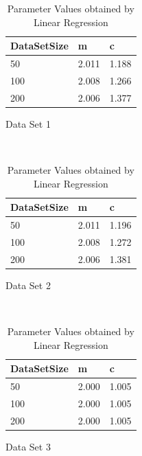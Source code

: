 \documentclass[14pt]{article}
\begin{document}
    \begin{table}[hbt!]
        \centering
        \begin{subtable}{.5\textwidth}
        \centering
            \begin{tabular}{|l|l|l|}
                \hline
                DataSetSize & m & c \\
                \hline 
                50 & 2.011 & 1.188 \\ 
                \hline
                100 & 2.008 & 1.266 \\ 
                \hline
                200 & 2.006 & 1.377 \\  
                \hline
            \end{tabular}
        \caption{Data Set 1}
        \label{tbl:ParamsD1}
        \end{subtable}
        ~
        \begin{subtable}{.5\textwidth}
        \centering
            \begin{tabular}{|l|l|l|}
                \hline
                DataSetSize & m & c \\
                \hline 
                50 & 2.011 & 1.196 \\ 
                \hline
                100 & 2.008 & 1.272 \\ 
                \hline
                200 & 2.006 & 1.381 \\  
                \hline 
            \end{tabular}
        \caption{Data Set 2}
        \label{tbl:ParamsD2}
        \end{subtable}
        ~
        \begin{subtable}{.5\textwidth}
        \centering
            \begin{tabular}{|l|l|l|}
                \hline
                DataSetSize & m & c \\
                \hline 
                50 & 2.000 & 1.005 \\ 
                \hline
                100 & 2.000 & 1.005 \\ 
                \hline
                200 & 2.000 & 1.005 \\ 
                \hline
            \end{tabular}
        \caption{Data Set 3}
        \label{tbl:ParamsD3}
        \end{subtable}

    \caption{Parameter Values obtained by Linear Regression}
    \label{tbl:ParamsData}
    \end{table}
\end{document}
